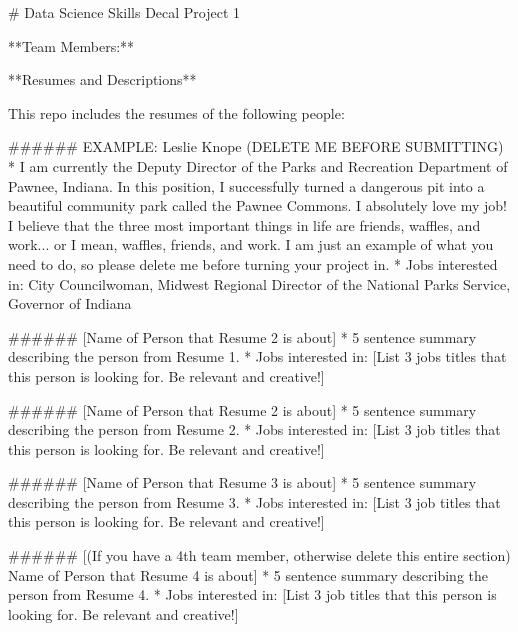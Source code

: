 # Data Science Skills Decal Project 1

**Team Members:**   

**Resumes and Descriptions**

This repo includes the resumes of the following people:

###### EXAMPLE: Leslie Knope (DELETE ME BEFORE SUBMITTING)
* I am currently the Deputy Director of the Parks and Recreation Department of Pawnee, Indiana. In this position, I successfully turned a dangerous pit into a beautiful community park called the Pawnee Commons. I absolutely love my job! I believe that the three most important things in life are friends, waffles, and work... or I mean, waffles, friends, and work. I am just an example of what you need to do, so please delete me before turning your project in.
* Jobs interested in: City Councilwoman, Midwest Regional Director of the National Parks Service, Governor of Indiana

###### [Name of Person that Resume 2 is about]
* 5 sentence summary describing the person from Resume 1.
* Jobs interested in: [List 3 jobs titles that this person is looking for. Be relevant and creative!]

###### [Name of Person that Resume 2 is about]
* 5 sentence summary describing the person from Resume 2.
* Jobs interested in: [List 3 job titles that this person is looking for. Be relevant and creative!]

###### [Name of Person that Resume 3 is about]
* 5 sentence summary describing the person from Resume 3.
* Jobs interested in: [List 3 job titles that this person is looking for. Be relevant and creative!]

###### [(If you have a 4th team member, otherwise delete this entire section) Name of Person that Resume 4 is about]
* 5 sentence summary describing the person from Resume 4.
* Jobs interested in: [List 3 job titles that this person is looking for. Be relevant and creative!]
